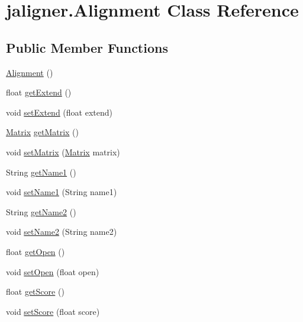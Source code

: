 \hypertarget{classjaligner_1_1_alignment}{\section{jaligner.\+Alignment Class Reference}
\label{classjaligner_1_1_alignment}
}
\subsection*{Public Member Functions}
\begin{DoxyCompactItemize}
\item 
\hyperlink{classjaligner_1_1_alignment_aeca673375e71e520b1e25eb9c05e0fb8}{Alignment} ()
\item 
float \hyperlink{classjaligner_1_1_alignment_a2b48d1d472b71c05059c245a85077f25}{get\+Extend} ()
\item 
void \hyperlink{classjaligner_1_1_alignment_a42a2cd2e2fc936bf3122e58efa3529c7}{set\+Extend} (float extend)
\item 
\hyperlink{classjaligner_1_1matrix_1_1_matrix}{Matrix} \hyperlink{classjaligner_1_1_alignment_a26e8a54855f80d1d43738ddfff3029a0}{get\+Matrix} ()
\item 
void \hyperlink{classjaligner_1_1_alignment_aee8b0ccf455806d2803a39e9c5da87a0}{set\+Matrix} (\hyperlink{classjaligner_1_1matrix_1_1_matrix}{Matrix} matrix)
\item 
String \hyperlink{classjaligner_1_1_alignment_adc95ebcd08efadf95a1c215d90100578}{get\+Name1} ()
\item 
void \hyperlink{classjaligner_1_1_alignment_acbf8298fb61e5c6b74d413e3d0b4fd98}{set\+Name1} (String name1)
\item 
String \hyperlink{classjaligner_1_1_alignment_ad656149e70e23a2f007bb543d0d393d8}{get\+Name2} ()
\item 
void \hyperlink{classjaligner_1_1_alignment_a5c68b2250dd2a7a544106a43c46a4fbf}{set\+Name2} (String name2)
\item 
float \hyperlink{classjaligner_1_1_alignment_a38930d997ad59fc254e83b8aee0a2cbd}{get\+Open} ()
\item 
void \hyperlink{classjaligner_1_1_alignment_a517634ccc2d6b59a6e0d99734bbf3c13}{set\+Open} (float open)
\item 
float \hyperlink{classjaligner_1_1_alignment_a81ee36cb77de6f426175da2a60791d8a}{get\+Score} ()
\item 
void \hyperlink{classjaligner_1_1_alignment_a1e3b847b5aac66ef038ed71be6c597b8}{set\+Score} (float score)

\end{DoxyCompactItemize}
